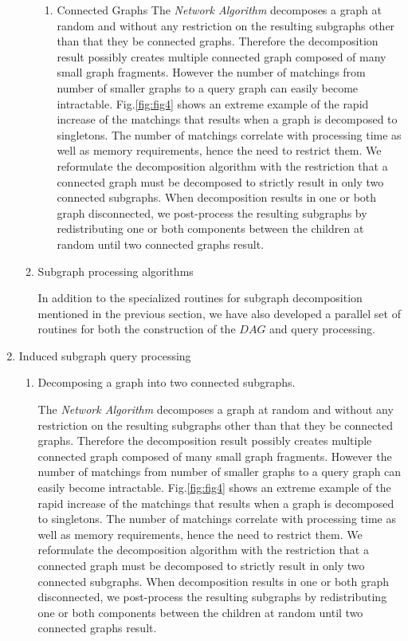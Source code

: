 \begin{enumerate}
\begin{enumerate}
\begin{enumerate}
\item Connected Graphs
The \textit{Network Algorithm} decomposes a graph at random and without any restriction on the resulting subgraphs other than that they be connected graphs.
Therefore the decomposition result possibly creates multiple connected graph composed of many small graph fragments.
However the number of matchings from number of smaller graphs to a query graph can easily become intractable.
Fig.\ref{fig:fig4} shows an extreme example of the rapid increase of the matchings that results when a graph is decomposed to singletons.
The number of matchings correlate with processing time as well as memory requirements, hence the need to restrict them. We reformulate the decomposition algorithm with the restriction that a connected graph must be decomposed to strictly result in only two connected subgraphs. When decomposition results in one or both graph disconnected, we post-process the resulting subgraphs by redistributing one or both components between the children  at random until two connected graphs result.

\end{enumerate}

\item Subgraph processing algorithms

In addition to the specialized routines for subgraph decomposition mentioned in the previous section,  we have also developed a parallel set of routines for both the construction of the $DAG$ and query processing. 

\end{enumerate}


\item Induced subgraph query processing

\begin{enumerate}
\item Decomposing a graph into two connected subgraphs.

The \textit{Network Algorithm} decomposes a graph at random and without any restriction on the resulting subgraphs other than that they be connected graphs.
Therefore the decomposition result possibly creates multiple connected graph composed of many small graph fragments.
However the number of matchings from number of smaller graphs to a query graph can easily become intractable.
Fig.\ref{fig:fig4} shows an extreme example of the rapid increase of the matchings that results when a graph is decomposed to singletons.
The number of matchings correlate with processing time as well as memory requirements, hence the need to restrict them. We reformulate the decomposition algorithm with the restriction that a connected graph must be decomposed to strictly result in only two connected subgraphs. When decomposition results in one or both graph disconnected, we post-process the resulting subgraphs by redistributing one or both components between the children  at random until two connected graphs result.


\end{enumerate}
\end{enumerate}
